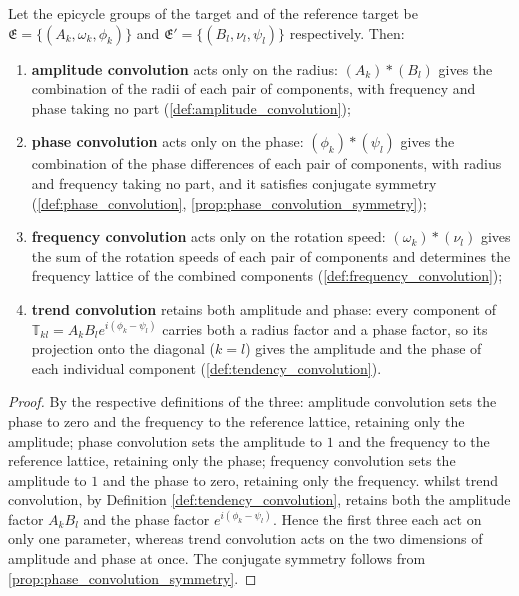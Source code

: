 \begin{theorem}\label{thm:ps_convolution_action}
Let the epicycle groups of the target and of the reference target be $\mathfrak{E}=\{(A_k,\omega_k,\phi_k)\}$ and $\mathfrak{E}'=\{(B_l,\nu_l,\psi_l)\}$ respectively. Then:
\begin{enumerate}[label=(\roman*)]
    \item \textbf{amplitude convolution} acts only on the radius: $(A_k)\ast(B_l)$ gives the combination of the radii of each pair of components, with frequency and phase taking no part (\cref{def:amplitude_convolution});
    \item \textbf{phase convolution} acts only on the phase: $(\phi_k)\ast(\psi_l)$ gives the combination of the phase differences of each pair of components, with radius and frequency taking no part, and it satisfies conjugate symmetry (\cref{def:phase_convolution}, \cref{prop:phase_convolution_symmetry});
    \item \textbf{frequency convolution} acts only on the rotation speed: $(\omega_k)\ast(\nu_l)$ gives the sum of the rotation speeds of each pair of components and determines the frequency lattice of the combined components (\cref{def:frequency_convolution});
    \item \textbf{trend convolution} retains both amplitude and phase: every component of $\mathbb T_{kl}=A_kB_le^{i(\phi_k-\psi_l)}$ carries both a radius factor and a phase factor, so its projection onto the diagonal ($k=l$) gives the amplitude and the phase of each individual component (\cref{def:tendency_convolution}).
\end{enumerate}
\end{theorem}

\begin{proof}
By the respective definitions of the three: amplitude convolution sets the phase to zero and the frequency to the reference lattice, retaining only the amplitude; phase convolution sets the amplitude to $1$ and the frequency to the reference lattice, retaining only the phase; frequency convolution sets the amplitude to $1$ and the phase to zero, retaining only the frequency. whilst trend convolution, by Definition \cref{def:tendency_convolution}, retains both the amplitude factor $A_kB_l$ and the phase factor $e^{i(\phi_k-\psi_l)}$. Hence the first three each act on only one parameter, whereas trend convolution acts on the two dimensions of amplitude and phase at once. The conjugate symmetry follows from \cref{prop:phase_convolution_symmetry}.
\end{proof}


